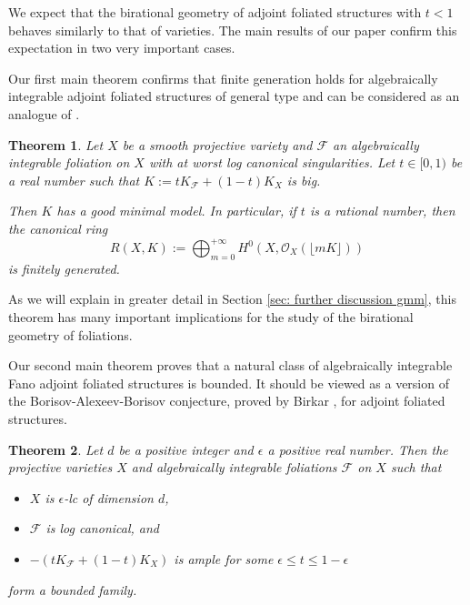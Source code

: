 \documentclass[12pt]{amsart}
\numberwithin{equation}{section}
\newcommand{\Ff}{\mathcal{F}}
\newtheorem{alphthm}{Theorem}
\theoremstyle{definition}
\theoremstyle{definition}
\theoremstyle{definition}
\begin{document}
We expect that the birational geometry of adjoint foliated structures with $t<1$ behaves similarly to that of varieties. 
The main results of our paper confirm this expectation in two very important cases.

Our first main theorem confirms that finite generation holds for algebraically integrable adjoint foliated structures of general type and can be considered as an analogue of \cite[Theorem 1.1]{BCHM10}.

\begin{alphthm}\label{thm: bchm analogue}
    Let $X$ be a smooth projective variety and $\Ff$ an algebraically integrable foliation on $X$ with at worst log canonical singularities. Let $t\in [0,1)$ be a real number such that $K:=tK_{\Ff}+(1-t)K_X$ is big. 

    Then $K$ has a good minimal model. In particular, if $t$ is a rational number, then the canonical ring
    $$R(X,K):=\bigoplus_{m=0}^{+\infty}H^0(X,\mathcal O_X(\lfloor mK\rfloor))$$
    is finitely generated.
\end{alphthm}

As we will explain in greater detail in Section \ref{sec: further discussion gmm}, this theorem has many important implications for the study of the birational geometry of foliations.

Our second main theorem proves that a natural class of algebraically integrable Fano adjoint foliated structures is bounded.  It should be viewed as a version of the Borisov-Alexeev-Borisov conjecture, proved by Birkar \cite[Theorem 1.1]{Bir21}, for adjoint foliated structures.

\begin{alphthm}\label{thm: BAB analogue}
Let $d$ be a positive integer and $\epsilon$ a positive real number. Then the projective varieties $X$ and algebraically integrable foliations $\Ff$ on $X$ such that 
\begin{itemize}
    \item $X$ is $\epsilon$-lc of dimension $d$, 
    \item $\Ff$ is log canonical, and
    \item $-(tK_{\Ff}+(1-t)K_X)$ is ample for some $\epsilon\leq t\leq 1-\epsilon$
\end{itemize}
form a bounded family.
\end{alphthm}
\end{document}
